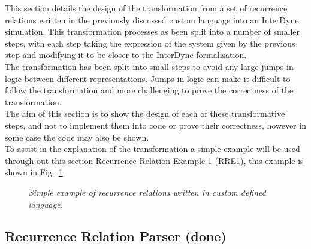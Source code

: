 \documentclass{article}
\begin{document}


This section details the design of the transformation from a set of recurrence relations written in the previously discussed custom language into an InterDyne simulation. This transformation processes  as been split into a number of smaller steps, with each step taking the expression of the system given by the previous step and modifying it to be closer to the InterDyne formalisation.\\
The transformation has been split into small steps to avoid any large jumps in logic between different representations. Jumps in logic can make it difficult to follow the transformation and more challenging to prove the correctness of the transformation.\\
The aim of this section is to show the design of each of these transformative steps, and not to implement them into code or prove their correctness, however in some case the code may also be shown.\\
To assist in the explanation of the transformation a simple example will be used through out this section Recurrence Relation Example 1 (RRE1), this example is shown in Fig.~\ref{fig:rre1}. 
\begin{figure}[H]
	\centering
	
	\caption{\it Simple example of recurrence relations written in custom defined language.}
	\label{fig:rre1}
\end{figure} 


\subsection{Recurrence Relation Parser (done)}  

\end{document}
